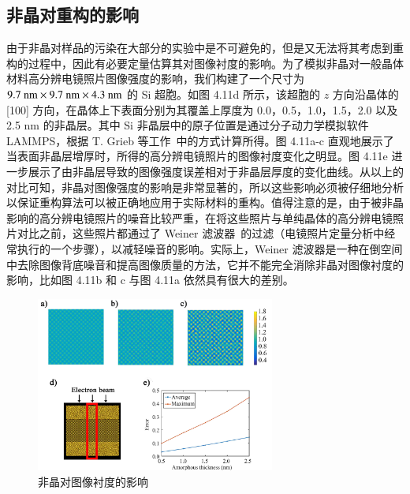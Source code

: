 \subsection{非晶对重构的影响}
由于非晶对样品的污染在大部分的实验中是不可避免的，但是又无法将其考虑到重构的过程中，因此有必要定量估算其对图像衬度的影响。为了模拟非晶对一般晶体材料高分辨电镜照片图像强度的影响，我们构建了一个尺寸为 $9.7 \textnormal{ nm} \times 9.7 \textnormal{ nm} \times 4.3 \textnormal{ nm}$ 的 Si  超胞。如图 4.11d 所示，该超胞的 $z$ 方向沿晶体的 [100] 方向，在晶体上下表面分别为其覆盖上厚度为 0.0，0.5，1.0，1.5，2.0 以及 2.5 nm 的非晶层。其中 Si 非晶层中的原子位置是通过分子动力学模拟软件 LAMMPS，根据 T. Grieb 等工作~\cite{Grieb2018}中的方式计算所得。图 4.11a-c 直观地展示了当表面非晶层增厚时，所得的高分辨电镜照片的图像衬度变化之明显。图 4.11e 进一步展示了由非晶层导致的图像强度误差相对于非晶层厚度的变化曲线。从以上的对比可知，非晶对图像强度的影响是非常显著的，所以这些影响必须被仔细地分析以保证重构算法可以被正确地应用于实际材料的重构。值得注意的是，由于被非晶影响的高分辨电镜照片的噪音比较严重，在将这些照片与单纯晶体的高分辨电镜照片对比之前，这些照片都通过了 Weiner 滤波器~\cite{Kilaas1998}的过滤（电镜照片定量分析中经常执行的一个步骤），以减轻噪音的影响。实际上，Weiner 滤波器是一种在倒空间中去除图像背底噪音和提高图像质量的方法，它并不能完全消除非晶对图像衬度的影响，比如图 4.11b 和 c 与图 4.11a 依然具有很大的差别。

\begin{figure}[htbp]
	\vspace{\baselineskip}
	\centering
	\includegraphics[width=0.7\textwidth]{../2.10/210}
	\caption{非晶对图像衬度的影响}\label{fig:210}
	\song{}
\end{figure}

